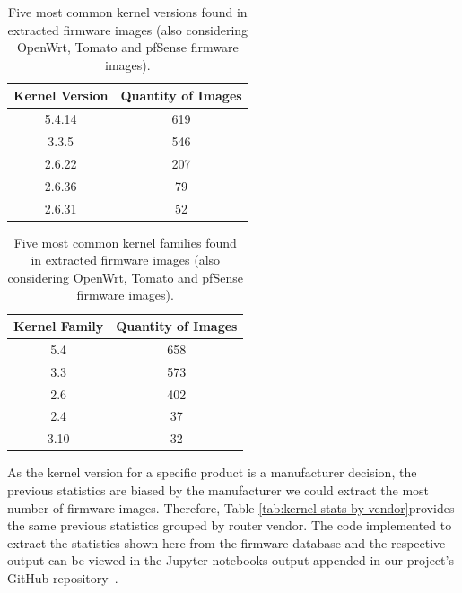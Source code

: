 \begin{table}[H]
\centering
\caption{Five most common kernel versions found in extracted firmware images (also considering OpenWrt, Tomato and pfSense firmware images).}
\begin{tabular}{|c|c|}
\hline
\textbf{Kernel Version} & \textbf{Quantity of Images} \\ \hline
5.4.14                  & 619                \\
3.3.5                   & 546                \\
2.6.22                  & 207                \\
2.6.36                  & 79                 \\
2.6.31                  & 52                 \\ \hline
\end{tabular}
\label{tab:kernel-stats-openwrt}
\end{table}

\begin{table}[H]
\centering
\caption{Five most common kernel families found in extracted firmware images (also considering OpenWrt, Tomato and pfSense firmware images).}
\begin{tabular}{|c|c|}
\hline
\textbf{Kernel Family} & \textbf{Quantity of Images} \\ \hline
5.4                    & 658                \\ 
3.3                    & 573                \\ 
2.6                    & 402                \\ 
2.4                    & 37                 \\ 
3.10                   & 32                 \\ \hline
\end{tabular}
\label{tab:kernel-family-stats-openwrt}
\end{table}

As the kernel version for a specific product is a manufacturer decision, the previous statistics are biased by the manufacturer we could extract the most number of firmware images. Therefore, Table \ref{tab:kernel-stats-by-vendor}provides the same previous statistics grouped by router vendor. The code implemented to extract the statistics shown here from the firmware database and the respective output can be viewed in the Jupyter notebooks output appended in our project's GitHub repository~\cite{github:c2dc-toso}. 

